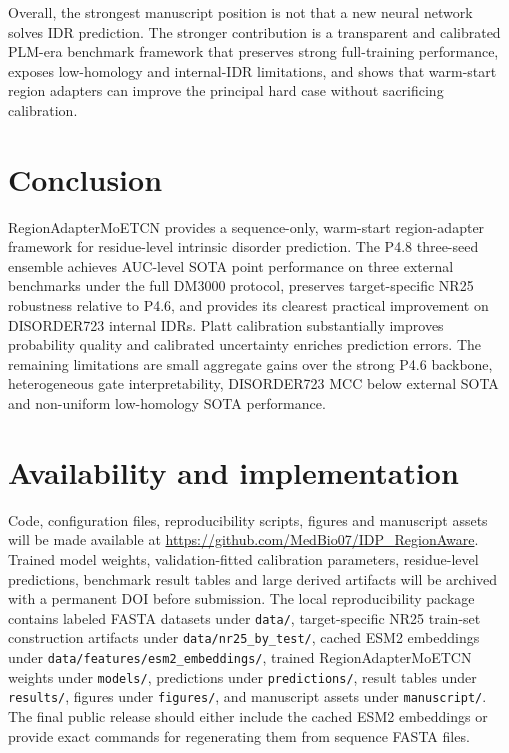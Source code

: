 \documentclass[namedate,webpdf,traditional,large]{oup-authoring-template}
\newcommand{\method}{RegionAdapterMoETCN}
\begin{document}
Overall, the strongest manuscript position is not that a new neural network solves IDR prediction. The stronger contribution is a transparent and calibrated PLM-era benchmark framework that preserves strong full-training performance, exposes low-homology and internal-IDR limitations, and shows that warm-start region adapters can improve the principal hard case without sacrificing calibration.

\section{Conclusion}

\method{} provides a sequence-only, warm-start region-adapter framework for residue-level intrinsic disorder prediction. The P4.8 three-seed ensemble achieves AUC-level SOTA point performance on three external benchmarks under the full DM3000 protocol, preserves target-specific NR25 robustness relative to P4.6, and provides its clearest practical improvement on DISORDER723 internal IDRs. Platt calibration substantially improves probability quality and calibrated uncertainty enriches prediction errors. The remaining limitations are small aggregate gains over the strong P4.6 backbone, heterogeneous gate interpretability, DISORDER723 MCC below external SOTA and non-uniform low-homology SOTA performance.

\section{Availability and implementation}

Code, configuration files, reproducibility scripts, figures and manuscript assets will be made available at \url{https://github.com/MedBio07/IDP_RegionAware}. Trained model weights, validation-fitted calibration parameters, residue-level predictions, benchmark result tables and large derived artifacts will be archived with a permanent DOI before submission. The local reproducibility package contains labeled FASTA datasets under \texttt{data/}, target-specific NR25 train-set construction artifacts under \texttt{data/nr25\_by\_test/}, cached ESM2 embeddings under \texttt{data/features/esm2\_embeddings/}, trained \method{} weights under \texttt{models/}, predictions under \texttt{predictions/}, result tables under \texttt{results/}, figures under \texttt{figures/}, and manuscript assets under \texttt{manuscript/}. The final public release should either include the cached ESM2 embeddings or provide exact commands for regenerating them from sequence FASTA files.
\end{document}
